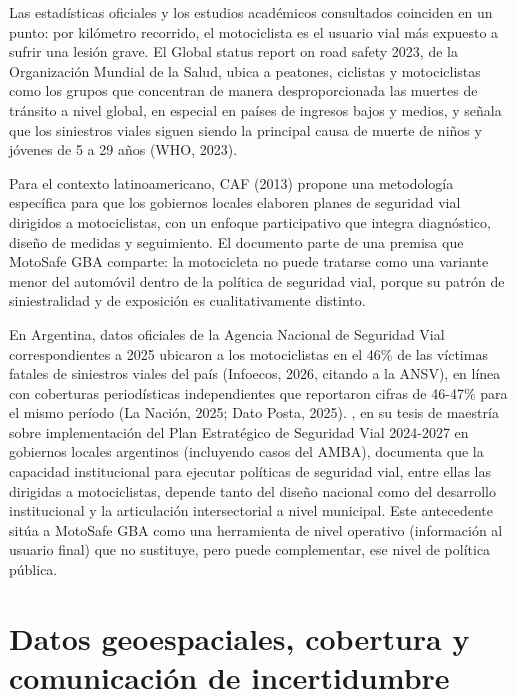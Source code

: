 Las estadísticas oficiales y los estudios académicos consultados
coinciden en un punto: por kilómetro recorrido, el motociclista es el
usuario vial más expuesto a sufrir una lesión grave. El Global status
report on road safety 2023, de la Organización Mundial de la Salud,
ubica a peatones, ciclistas y motociclistas como los grupos que
concentran de manera desproporcionada las muertes de tránsito a nivel
global, en especial en países de ingresos bajos y medios, y señala que
los siniestros viales siguen siendo la principal causa de muerte de
niños y jóvenes de 5 a 29 años (WHO, 2023).

Para el contexto latinoamericano, CAF (2013) propone una metodología
específica para que los gobiernos locales elaboren planes de seguridad
vial dirigidos a motociclistas, con un enfoque participativo que integra
diagnóstico, diseño de medidas y seguimiento. El documento parte de una
premisa que MotoSafe GBA comparte: la motocicleta no puede tratarse como
una variante menor del automóvil dentro de la política de seguridad
vial, porque su patrón de siniestralidad y de exposición es
cualitativamente distinto.

En Argentina, datos oficiales de la Agencia Nacional de Seguridad Vial
correspondientes a 2025 ubicaron a los motociclistas en el 46\% de las
víctimas fatales de siniestros viales del país (Infoecos, 2026, citando
a la ANSV), en línea con coberturas periodísticas independientes que
reportaron cifras de 46-47\% para el mismo período (La Nación, 2025;
Dato Posta, 2025). \citet{camacho2025}, en su tesis de maestría sobre
implementación del Plan Estratégico de Seguridad Vial 2024-2027 en
gobiernos locales argentinos (incluyendo casos del AMBA), documenta que
la capacidad institucional para ejecutar políticas de seguridad vial,
entre ellas las dirigidas a motociclistas, depende tanto del diseño
nacional como del desarrollo institucional y la articulación
intersectorial a nivel municipal. Este antecedente sitúa a MotoSafe GBA
como una herramienta de nivel operativo (información al usuario final)
que no sustituye, pero puede complementar, ese nivel de política
pública.

\section{Datos geoespaciales, cobertura y comunicación de incertidumbre}

